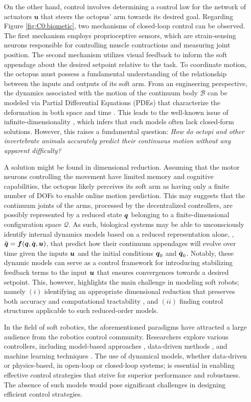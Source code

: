 On the other hand, control involves determining a control law for the network of actuators $\textbf{u}$ that steers the octopus' arm towards its desired goal. Regarding Figure \ref{fig:C0:biometic}, two mechanisms of closed-loop control can be observed. The first mechanism employs proprioceptive sensors, which are strain-sensing neurons responsible for controlling muscle contractions and measuring joint position. The second mechanism utilizes visual feedback to inform the soft appendage about the desired setpoint relative to the task. To coordinate motion, the octopus must possess a fundamental understanding of the relationship between the inputs and outputs of its soft arm. From an engineering perspective, the dynamics associated with the motion of the continuum body $\mathcal{B}$ can be modeled via Partial Differential Equations (PDEs) that characterize the deformation in both space and time \cite{Armanini2023,DellaSantina2021,Rus2015}. This leads to the well-known issue of infinite-dimensionality \cite{DellaSantina2020,Holzapfel2002,Mochiyama1992}, which infers that such models often lack closed-form solutions. However, this raises a fundamental question: \emph{How do octopi and other invertebrate animals accurately predict their continuous motion without any apparent difficulty?} 

A solution might be found in dimensional reduction. Assuming that the motor neurons controlling the movement have limited memory and cognitive capabilities, the octopus likely perceives its soft arm as having only a finite number of DOFs to enable online motion prediction. This may suggests that the continuum joints of the arms, processed by the decentralized controllers, are possibly represented by a reduced state ${\boldsymbol{q}}$ belonging to a finite-dimensional configuration space $\mathcal{Q}$. As such, biological systems may be able to unconsciously identify internal dynamics models based on a reduced representation alone, \eg, ${\ddot{\boldsymbol{q}}} = {\boldsymbol{f}}({\boldsymbol{q}},{\dot{\boldsymbol{q}}},{\boldsymbol{u}})$, that predict how their continuum appendages will evolve over time given the inputs ${\boldsymbol{u}}$ and the initial conditions ${\boldsymbol{q}}_0$ and ${\dot{\boldsymbol{q}}}_0$. Notably, these dynamic models can serve as a control framework for introducing stabilizing feedback terms to the input ${\boldsymbol{u}}$ that ensures convergences towards a desired setpoint. This, however, highlights the main challenge in modeling soft robots; namely $(i)$ identifying an appropriate dimensional reduction that preserves both accuracy and computational tractability \cite{DellaSantina2021}, and $(ii)$ finding control structures applicable to such reduced-order models.

In the field of soft robotics, the aforementioned paradigms have attracted a large audience from the robotics control community. Researchers explore various controllers, including model-based approaches \cite{Armanini2023,DellaSantina2021,Milana2021,Franco2020}, data-driven methods \cite{Bruder2019,Alora2022}, and machine learning techniques \cite{Thuruthel2017Oct,Thuruthel2018Nov,Kim2021Feb,Schegg2022}. The use of dynamical models, whether data-driven or physics-based, in open-loop or closed-loop systems; is essential in enabling effective control strategies that strive for superior performance and robustness. The absence of such models would pose significant challenges in designing efficient control strategies.
